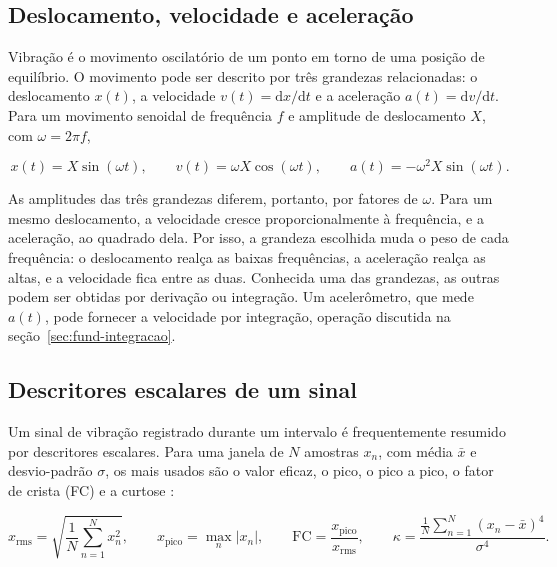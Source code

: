 \subsection{Deslocamento, velocidade e aceleração}

Vibração é o movimento oscilatório de um ponto em torno de uma posição de equilíbrio. O movimento pode
ser descrito por três grandezas relacionadas: o deslocamento $x(t)$, a velocidade
$v(t) = \mathrm{d}x/\mathrm{d}t$ e a aceleração $a(t) = \mathrm{d}v/\mathrm{d}t$. Para um movimento
senoidal de frequência $f$ e amplitude de deslocamento $X$, com $\omega = 2\pi f$,

\begin{equation}
x(t) = X \sin(\omega t), \qquad
v(t) = \omega X \cos(\omega t), \qquad
a(t) = -\omega^2 X \sin(\omega t).
\label{eq:fund-senoide}
\end{equation}

As amplitudes das três grandezas diferem, portanto, por fatores de $\omega$. Para um mesmo deslocamento,
a velocidade cresce proporcionalmente à frequência, e a aceleração, ao quadrado dela. Por isso, a grandeza
escolhida muda o peso de cada frequência: o deslocamento realça as baixas frequências, a aceleração realça
as altas, e a velocidade fica entre as duas. Conhecida uma das grandezas, as outras podem ser obtidas por
derivação ou integração. Um acelerômetro, que mede $a(t)$, pode fornecer a velocidade por integração,
operação discutida na seção~\ref{sec:fund-integracao}.

\subsection{Descritores escalares de um sinal}
\label{sec:fund-descritores}

Um sinal de vibração registrado durante um intervalo é frequentemente resumido por descritores escalares.
Para uma janela de $N$ amostras $x_n$, com média $\bar{x}$ e desvio-padrão $\sigma$, os mais usados são o
valor eficaz, o pico, o pico a pico, o fator de crista (FC) e a curtose \cite{randall2011livro}:

\begin{equation}
x_{\mathrm{rms}} = \sqrt{\frac{1}{N}\sum_{n=1}^{N} x_n^2},
\qquad
x_{\mathrm{pico}} = \max_n |x_n|,
\qquad
\mathrm{FC} = \frac{x_{\mathrm{pico}}}{x_{\mathrm{rms}}},
\qquad
\kappa = \frac{\frac{1}{N}\sum_{n=1}^{N} (x_n-\bar{x})^4}{\sigma^4}.
\label{eq:fund-descritores}
\end{equation}

